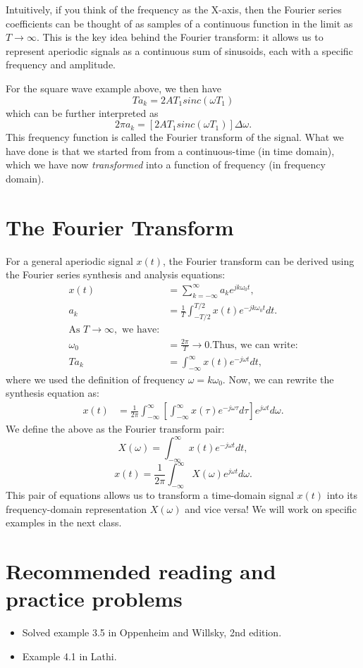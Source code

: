 \documentclass{ee102_notes}
\begin{document}
Intuitively, if you think of the frequency as the X-axis, then the Fourier series coefficients can be thought of as samples of a continuous function in the limit as $T \to \infty$. This is the key idea behind the Fourier transform: it allows us to represent aperiodic signals as a continuous sum of sinusoids, each with a specific frequency and amplitude.

For the square wave example above, we then have
\[
T a_k = 2 A T_1 sinc(\omega T_1)
\]
which can be further interpreted as  
\[
2\pi a_k = \left[2A T_1 sinc(\omega T_1) \right] \Delta \omega.
\]
This frequency function is called the Fourier transform of the signal. What we have done is that we started from from a continuous-time (in time domain), which we have now \emph{transformed} into a function of frequency (in frequency domain).

\section{The Fourier Transform}
For a general aperiodic signal $x(t)$, the Fourier transform can be derived using the Fourier series synthesis and analysis equations:
\begin{align*}
    x(t) &= \sum_{k=-\infty}^{\infty} a_k e^{jk\omega_0 t}, \\
    a_k &= \frac{1}{T} \int_{-T/2}^{T/2} x(t) e^{-jk\omega_0 t} dt. \\
    \text{As } T \to \infty, \text{ we have:} \\
    \omega_0 &= \frac{2\pi}{T} \to 0.
    \text{Thus, we can write:} \\
    T a_k &= \int_{-\infty}^{\infty} x(t) e^{-j\omega t} dt,
\end{align*}
where we used the definition of frequency $\omega = k \omega_0$. Now, we can rewrite the synthesis equation as:
\begin{align*}
    x(t) &= \frac{1}{2\pi} \int_{-\infty}^{\infty} \left[ \int_{-\infty}^{\infty} x(\tau) e^{-j\omega \tau} d\tau \right] e^{j\omega t} d\omega.
\end{align*}
We define the above as the Fourier transform pair:
\[
X(\omega) = \int_{-\infty}^{\infty} x(t) e^{-j\omega t} dt,
\]
\[
x(t) = \frac{1}{2\pi} \int_{-\infty}^{\infty} X(\omega) e^{j\omega t} d\omega.
\]
This pair of equations allows us to transform a time-domain signal $x(t)$ into its frequency-domain representation $X(\omega)$ and vice versa! We will work on specific examples in the next class.

\section{Recommended reading and practice problems}
\begin{itemize}
    \item Solved example 3.5 in Oppenheim and Willsky, 2nd edition.
    \item Example 4.1 in Lathi.
\end{itemize}
\end{document}
